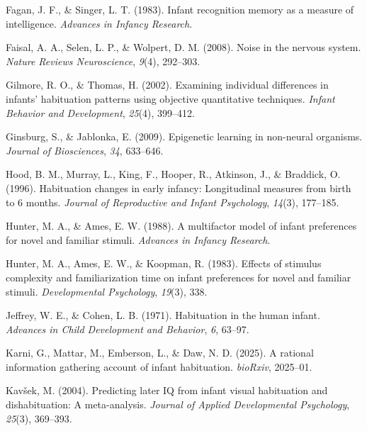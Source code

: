 \documentclass[10pt, letterpaper]{article}
\newenvironment{CSLReferences}%
  {}%
  {\par}
\begin{document}
\begin{CSLReferences}{1}{0}
\leavevmode{}%
Fagan, J. F., \& Singer, L. T. (1983). Infant recognition memory as a
measure of intelligence. \emph{Advances in Infancy Research}.

\leavevmode{}%
Faisal, A. A., Selen, L. P., \& Wolpert, D. M. (2008). Noise in the
nervous system. \emph{Nature Reviews Neuroscience}, \emph{9}(4),
292--303.

\leavevmode{}%
Gilmore, R. O., \& Thomas, H. (2002). Examining individual differences
in infants' habituation patterns using objective quantitative
techniques. \emph{Infant Behavior and Development}, \emph{25}(4),
399--412.

\leavevmode{}%
Ginsburg, S., \& Jablonka, E. (2009). Epigenetic learning in non-neural
organisms. \emph{Journal of Biosciences}, \emph{34}, 633--646.

\leavevmode{}%
Hood, B. M., Murray, L., King, F., Hooper, R., Atkinson, J., \&
Braddick, O. (1996). Habituation changes in early infancy: Longitudinal
measures from birth to 6 months. \emph{Journal of Reproductive and
Infant Psychology}, \emph{14}(3), 177--185.

\leavevmode{}%
Hunter, M. A., \& Ames, E. W. (1988). A multifactor model of infant
preferences for novel and familiar stimuli. \emph{Advances in Infancy
Research}.

\leavevmode{}%
Hunter, M. A., Ames, E. W., \& Koopman, R. (1983). Effects of stimulus
complexity and familiarization time on infant preferences for novel and
familiar stimuli. \emph{Developmental Psychology}, \emph{19}(3), 338.

\leavevmode{}%
Jeffrey, W. E., \& Cohen, L. B. (1971). Habituation in the human infant.
\emph{Advances in Child Development and Behavior}, \emph{6}, 63--97.

\leavevmode{}%
Karni, G., Mattar, M., Emberson, L., \& Daw, N. D. (2025). A rational
information gathering account of infant habituation. \emph{bioRxiv},
2025--01.

\leavevmode{}%
Kavšek, M. (2004). Predicting later IQ from infant visual habituation
and dishabituation: A meta-analysis. \emph{Journal of Applied
Developmental Psychology}, \emph{25}(3), 369--393.


\end{CSLReferences}
\end{document}
